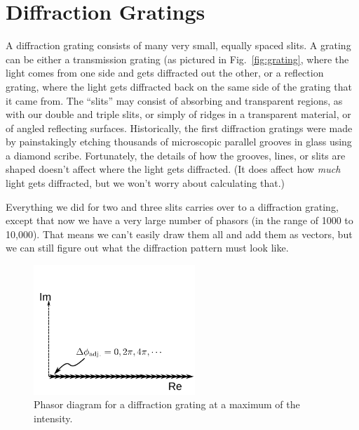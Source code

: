\section{Diffraction Gratings}
\label{sec:diffraction_gratings}

A  diffraction grating  consists of  many very  small,  equally spaced
slits. A grating can be either a transmission grating (as pictured
in Fig.~\ref{fig:grating}, where the light
comes from one side and gets diffracted out the other, or a reflection
grating, where the light gets diffracted  back on the same side of the
grating that it came from.  The ``slits'' may consist of absorbing and
transparent regions, as with our double and triple slits, or simply of
ridges in  a transparent material,  or of angled  reflecting surfaces.
Historically,   the   first   diffraction   gratings  were   made   by
painstakingly  etching thousands  of microscopic  parallel  grooves in
glass using a diamond scribe.  Fortunately, the details of how the
grooves, lines, or slits are shaped doesn't affect where the light gets diffracted. (It does affect how \emph{much} light gets diffracted, but we won't worry about calculating that.) 

Everything  we  did  for  two  and  three  slits  carries  over  to  a
diffraction grating,  except that now we  have a very  large number of
phasors (in the  range of 1000 to 10,000). That  means we can't easily
draw them  all and add  them as vectors,  but we can still  figure out
what the diffraction pattern must look like. 


\begin{figure}
\begin{center}\includegraphics[width=2.4in]{phasors/gratingPhasorMax}
\end{center}
\caption{\label{gratingMaxFig}Phasor diagram for a diffraction grating
at a maximum of the intensity.}
\end{figure}


